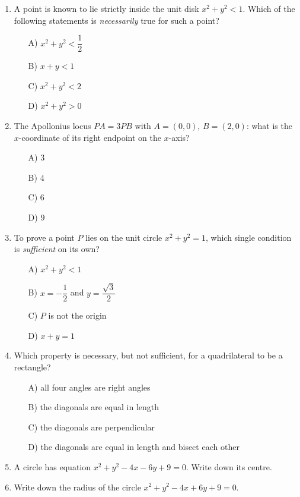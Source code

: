 \documentclass[11pt,a4paper]{article}
\begin{document}
\begin{enumerate}
\item A point is known to lie strictly inside the unit disk $x^2+y^2<1$. Which of the following statements is {\em necessarily} true for such a point?
\begin{itemize}
\item[A)] $x^2+y^2<\dfrac12$
\item[B)] $x+y<1$
\item[C)] $x^2+y^2<2$
\item[D)] $x^2+y^2>0$
\end{itemize}

\item The Apollonius locus $PA=3PB$ with $A=(0,0)$, $B=(2,0)$: what is the $x$-coordinate of its right endpoint on the $x$-axis?
\begin{itemize}
\item[A)] $3$
\item[B)] $4$
\item[C)] $6$
\item[D)] $9$
\end{itemize}

\item To prove a point $P$ lies on the unit circle $x^2+y^2=1$, which single condition is {\em sufficient} on its own?
\begin{itemize}
\item[A)] $x^2+y^2<1$
\item[B)] $x=-\dfrac12$ and $y=\dfrac{\sqrt3}{2}$
\item[C)] $P$ is not the origin
\item[D)] $x+y=1$
\end{itemize}

\item Which property is necessary, but not sufficient, for a quadrilateral to be a rectangle?
\begin{itemize}
\item[A)] all four angles are right angles
\item[B)] the diagonals are equal in length
\item[C)] the diagonals are perpendicular
\item[D)] the diagonals are equal in length and bisect each other
\end{itemize}

\item A circle has equation $x^2+y^2-4x-6y+9=0$. Write down its centre.

\item Write down the radius of the circle $x^2+y^2-4x+6y+9=0$.

\end{enumerate}
\end{document}
